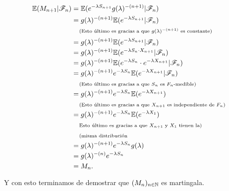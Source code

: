 \begin{itemize}
            \begin{align}
                \mathbb{E}(M_{n+1} | \mathscr{F}_n)      &=      \mathbb{E}(e^{-\lambda S_{n+1}}g(\lambda)^{-(n+1)}|\mathscr{F}_n)                                        \\
                                        &=      g(\lambda)^{-(n+1)}\mathbb{E}(e^{-\lambda S_{n+1}}|\mathscr{F}_n)                                        \\
                                        &\;\;\;\;\mbox{{\scriptsize(Esto último es gracias a que $g(\lambda)^{-(n+1)}$ es constante)}}               		\\
                                        &=      g(\lambda)^{-(n+1)}\mathbb{E}(e^{-\lambda S_{n+1}}|\mathscr{F}_n)                                        \\
                                        &=      g(\lambda)^{-(n+1)}\mathbb{E}(e^{-\lambda S_{n} \cdot X_{n+1}}|\mathscr{F}_n)                            \\
                                        &=      g(\lambda)^{-(n+1)}\mathbb{E}(e^{-\lambda S_{n}} \cdot e^{-\lambda X_{n+1}}|\mathscr{F}_n)               \\
                                        &=      g(\lambda)^{-(n+1)} e^{-\lambda S_{n}} \mathbb{E}(e^{-\lambda X_{n+1}}|\mathscr{F}_n)                    \\                                       
                                        &\;\;\;\;\mbox{{\scriptsize(Esto último es gracias a que $S_n$ es $F_n$-medible)}}                           		\\
                                        &=      g(\lambda)^{-(n+1)} e^{-\lambda S_{n}} \mathbb{E}(e^{-\lambda X_{n+1}})                         \\
                                        &\;\;\;\;\mbox{{\scriptsize(Esto último es gracias a que $X_{n+1}$ es independiente de $F_n$)}}              		\\
                                        &=      g(\lambda)^{-(n+1)} e^{-\lambda S_{n}} \mathbb{E}(e^{-\lambda X_{1}})                           \\
                                        &\;\;\;\;\mbox{{\scriptsize Esto último es gracias a que $X_{n+1}$ y $X_1$ tienen la)}}                       	    \\ 
                                        &\;\;\;\;\mbox{{\scriptsize(misma distribución}}   															    \\
                                        &=      g(\lambda)^{-(n+1)} e^{-\lambda S_{n}} g(\lambda)                                       \\
                                        &=      g(\lambda)^{-(n)} e^{-\lambda S_{n}}                                                    \\
                                        &=      M_n.
            \end{align}\pn
    \end{itemize}
    
    Y con esto terminamos de demostrar que $(M_n)_{n \in \mathbb{N}}$ es martingala.